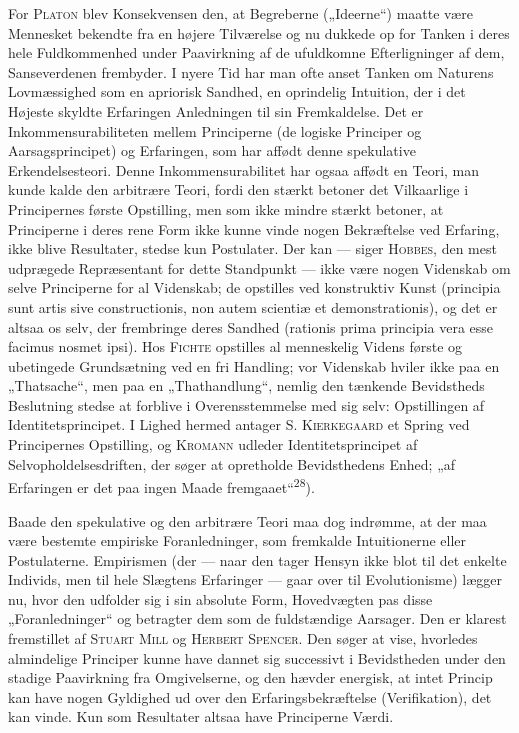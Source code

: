 \documentclass[12pt,a4paper,openany]{book}
\newcommand{\opage}[1]{\marginnote{\footnotesize\textit{[#1]}}}
\begin{document}
For \textsc{Platon} blev Konsekvensen den, at Begreberne („Ideerne“) maatte
være Mennesket bekendte fra en højere Tilværelse og nu dukkede op for Tanken i
deres hele Fuldkommenhed under Paavirkning af de ufuldkomne Efterligninger af
dem, Sanseverdenen frembyder. I nyere Tid har man ofte anset Tanken om Naturens
Lovmæssighed som en apriorisk Sandhed, en oprindelig Intuition, der i det
Højeste skyldte Erfaringen Anledningen til sin Fremkaldelse. Det er
Inkommensurabiliteten mellem Principerne (de logiske Principer og
Aarsagsprincipet) og Erfaringen, som har affødt denne spekulative
Erkendelsesteori. Denne Inkommensurabilitet har ogsaa affødt en Teori, man
kunde kalde den arbitrære Teori, fordi den stærkt betoner det Vilkaarlige i
Principernes første Opstilling, men som ikke mindre stærkt betoner, at
Principerne i deres rene Form ikke kunne vinde nogen Bekræftelse ved Erfaring,
ikke blive Resultater, stedse kun Postulater. Der kan --- siger
\textsc{Hobbes,} den mest udprægede Repræsentant for dette Standpunkt --- ikke
\opage{32}være nogen Videnskab om selve Principerne for al Videnskab; de
opstilles ved konstruktiv Kunst (principia sunt artis sive constructionis, non
autem scientiæ et demonstrationis), og det er altsaa os selv, der frembringe
deres Sandhed (rationis prima principia vera esse facimus nosmet ipsi). Hos
\textsc{Fichte} opstilles al menneskelig Videns første og ubetingede
Grundsætning ved en fri Handling; vor Videnskab hviler ikke paa en „Thatsache“,
men paa en „Thathandlung“, nemlig den tænkende Bevidstheds Beslutning stedse at
forblive i Overensstemmelse med sig selv: Opstillingen af Identitetsprincipet.
I Lighed hermed antager \textsc{S. Kierkegaard} et Spring ved Principernes
Opstilling, og \textsc{Kromann} udleder Identitetsprincipet af
Selvopholdelsesdriften, der søger at opretholde Bevidsthedens Enhed; „af
Erfaringen er det paa ingen Maade fremgaaet“\textsuperscript{28}).

Baade den spekulative og den arbitrære Teori maa dog indrømme, at der maa være
bestemte empiriske Foranledninger, som fremkalde Intuitionerne eller
Postulaterne. Empirismen (der --- naar den tager Hensyn ikke blot til det
enkelte Individs, men til hele Slægtens Erfaringer --- gaar over til
Evolutionisme) lægger nu, hvor den udfolder sig i sin absolute Form,
Hovedvægten pas disse „Foranledninger“ og betragter dem som de fuldstændige
Aarsager. Den er klarest fremstillet af \textsc{Stuart Mill} og \textsc{Herbert
Spencer}. Den søger at vise, hvorledes almindelige Principer kunne have dannet
sig successivt i Bevidstheden under den stadige Paavirkning fra Omgivelserne,
og den hævder energisk, at intet Princip kan have nogen Gyldighed ud over den
Erfaringsbekræftelse (Verifikation), det kan vinde. Kun som Resultater altsaa
have Principerne Værdi.
\end{document}
